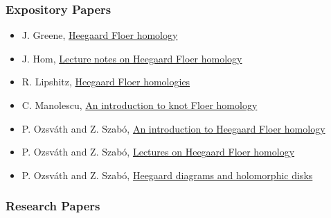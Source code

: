 \hypertarget{expository-papers}{%
\subsubsection{Expository Papers}\label{expository-papers}}

\begin{itemize}
\tightlist
\item
  \autocite{G} J. Greene,
  \href{https://www.ams.org/journals/notices/202101/rnoti-p19.pdf}{Heegaard
  Floer homology}
\item
  \autocite{H} J. Hom,
  \href{https://arxiv.org/pdf/2008.01836.pdf}{Lecture notes on Heegaard
  Floer homology}
\item
  \autocite{L} R. Lipshitz,
  \href{https://arxiv.org/abs/1411.4540}{Heegaard Floer homologies}
\item
  \autocite{M} C. Manolescu, \href{https://arxiv.org/abs/1401.7107}{An
  introduction to knot Floer homology}
\item
  \autocite{OS-1} P. Ozsváth and Z. Szabó,
  \href{https://web.math.princeton.edu/~petero/Introduction.pdf}{An
  introduction to Heegaard Floer homology}
\item
  \autocite{OS-2} P. Ozsváth and Z. Szabó,
  \href{https://web.math.princeton.edu/~petero/Lectures.pdf}{Lectures on
  Heegaard Floer homology}
\item
  \autocite{OS-3} P. Ozsváth and Z. Szabó,
  \href{https://arxiv.org/pdf/math/0403029.pdf}{Heegaard diagrams and
  holomorphic disks}
\end{itemize}

\hypertarget{research-papers}{%
\subsubsection{Research Papers}\label{research-papers}}

